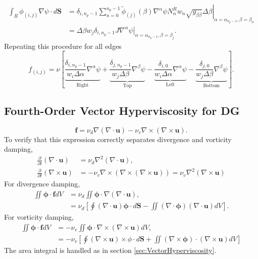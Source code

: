 \documentclass{article}
\newcommand{\vb}{\mathbf}
\newcommand{\vg}{\boldsymbol}
\newcommand{\pdiff}[2]{\frac{\partial #1}{\partial #2}}
\begin{document}
\begin{align}
\int_R \phi_{(i,j)} \nabla \psi \cdot d\vb{S} &= \delta_{i,n_p-1} \sum_{n=0}^{n_p-1} \left. \tilde{\phi}_{(j)}(\beta) \nabla^\alpha \psi N^R_\alpha w_n \sqrt{g_{\beta \beta}} \Delta \beta \right\vert_{\alpha = \alpha_{n_p-1}, \beta = \beta_n} \\
&= \Delta \beta w_j \delta_{i,n_p-1} \left. J \nabla^\alpha \psi \right\vert_{\alpha = \alpha_{n_p-1}, \beta = \beta_j}.
\end{align}  Repeating this procedure for all edges
\begin{equation}
f_{(i,j)} = \nu \left[ \underbrace{\frac{\delta_{i,n_p-1}}{w_i \Delta \alpha} \nabla^\alpha \psi}_{\mbox{Right}} + \underbrace{\frac{\delta_{j,n_p-1}}{w_j \Delta \beta} \nabla^\beta \psi}_{\mbox{Top}} - \underbrace{\frac{\delta_{i,0}}{w_i \Delta \alpha} \nabla^\alpha \psi}_{\mbox{Left}} - \underbrace{\frac{\delta_{j,0}}{w_j \Delta \beta} \nabla^\beta \psi}_{\mbox{Bottom}} \right].
\end{equation}

\subsection{Fourth-Order Vector Hyperviscosity for DG}
\begin{equation}
\vb{f} = \nu_d \nabla (\nabla \cdot \vb{u}) - \nu_v \nabla \times (\nabla \times \vb{u}).
\end{equation}  To verify that this expression correctly separates divergence and vorticity damping,
\begin{align}
\pdiff{}{t} (\nabla \cdot \vb{u}) &= \nu_d \nabla^2 (\nabla \cdot \vb{u}), \\
\pdiff{}{t} (\nabla \times \vb{u}) &= - \nu_v \nabla \times (\nabla \times (\nabla \times \vb{u})) = \nu_v \nabla^2 (\nabla \times \vb{u})
\end{align}  For divergence damping,
\begin{align}
\iint \vg{\phi} \cdot \vb{f} dV &= \nu_d \iint \vg{\phi} \cdot \nabla (\nabla \cdot \vb{u}), \\
&= \nu_d \left[ \oint (\nabla \cdot \vb{u}) \vg{\phi} \cdot d\vb{S} - \iint (\nabla \cdot \vg{\phi}) (\nabla \cdot \vb{u}) dV \right].
\end{align}  For vorticity damping,
\begin{align}
\iint \vg{\phi} \cdot \vb{f} dV &= - \nu_v \iint \vg{\phi} \cdot \nabla \times (\nabla \times \vb{u}) dV, \\
&= - \nu_v \left[ \oint (\nabla \times \vb{u}) \times \phi \cdot d\vb{S} + \iint (\nabla \times \vg{\phi}) \cdot (\nabla \times \vb{u}) dV \right]
\end{align}  The area integral is handled as in section \ref{sec:VectorHyperviscosity}.
\end{document}
